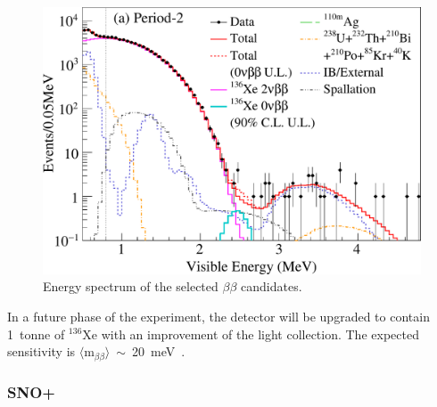 \documentclass[main.tex]{subfiles}
\begin{document}



\begin{figure}[h!]
\begin{center}
\includegraphics[scale=0.5]{pictures/Chap2/fig2a.pdf}
\caption{Energy spectrum of the selected $\beta\beta$ candidates.}
\label{KamLANDZenResults}
\end{center}
\end{figure}



\NI In a future phase of the experiment, the detector will be upgraded to contain 1~tonne of $^{\text{136}}$Xe with an improvement of the light collection. The expected sensitivity is $\langle \text{m}_{\beta\beta} \rangle$~$\sim$~20~meV~\cite{KamLAND-Zen3}.


\FloatBarrier


\subsubsection{SNO+}
\end{document}
